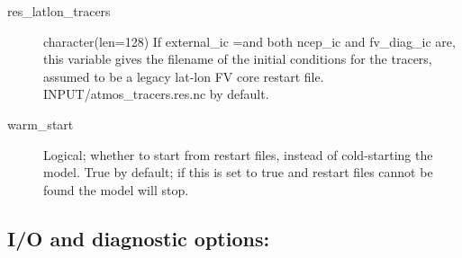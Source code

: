 \documentclass[12pt,letterpaper]{book}
\begin{document}
\begin{description}
\item[res\_latlon\_tracers] character(len=128) If external\_ic 
=\true  and both ncep\_ic and fv\_diag\_ic are\false , this variable gives the filename of the initial conditions for the tracers, assumed to be a legacy lat-lon FV core restart file. INPUT/atmos\_tracers.res.nc by default. 


\item[warm\_start] Logical; whether to start from restart files, instead of cold-starting the model. True by default; if this is set to true and restart files cannot be found the model will stop.


\end{description}

\subsection{I/O and diagnostic options:}
\end{document}
